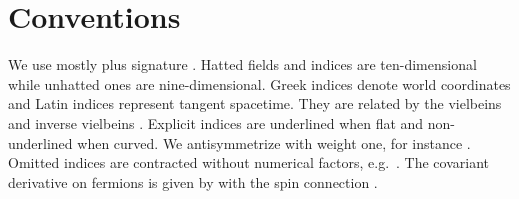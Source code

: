 \documentclass[12pt,a4paper]{article}
\begin{document}
\section{Conventions}
We use mostly plus signature \myHighlight{$(-+\cdots +)$}\coordHE{}. Hatted fields
and indices are ten-dimensional while unhatted ones
are nine-dimensional. Greek indices
\myHighlight{$\hat \mu,\hat \nu,\hat \rho\ldots$}\coordHE{} denote world coordinates and Latin indices
\coordHE{} represent tangent spacetime. They are related by the
vielbeins \coordHE{} and inverse vielbeins \coordHE{}.
Explicit indices \coordHE{} are underlined when flat and non-underlined when curved.
We antisymmetrize with weight one, for instance
\coordHE{}.
Omitted indices are contracted without numerical factors,
e.g.~\coordHE{}. The covariant derivative
on fermions is given by \coordHE{} with the spin connection
\coordHE{}.
\end{document}
